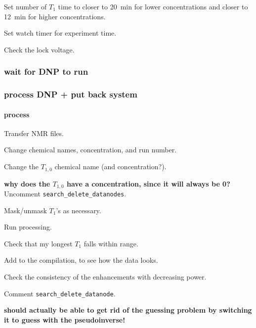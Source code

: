 Set number of $T_1$ time to closer to 20~min for lower concentrations and closer to 12~min for higher concentrations.

Set watch timer for experiment time.

Check the lock voltage.

\subsubsection{wait for DNP to run}
\subsubsection{process DNP + put back system}\label{sec:concissues_dopclowconc_process}
\paragraph{process}
Transfer NMR files.

Change chemical names, concentration, and run number.

Change the $T_{1,0}$ chemical name (and concentration?).

{\bf why does the $T_{1,0}$ have a concentration, since it will always be 0?}
Uncomment {\tt search\_delete\_datanodes}.

Mask/unmask $T_1$'s as necessary.

Run processing.

Check that my longest $T_1$ falls within range.

Add to the compilation, to see how the data looks.

Check the consistency of the enhancements with decreasing power.

Comment {\tt search\_delete\_datanode}.

{\bf should actually be able to get rid of the guessing problem by switching it to guess with the pseudoinverse!}


